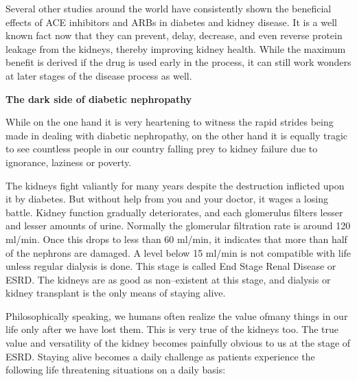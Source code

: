 Several other studies around the world have consistently shown the beneficial effects of ACE inhibitors and ARBs in diabetes and kidney disease. It is a well known fact now that they can prevent, delay, decrease, and even reverse protein leakage from the kidneys, thereby improving kidney health. While the maximum benefit is derived if the drug is used early in the process, it can still work wonders at later stages of the disease process as well.

\noindent\textbf{The dark side of diabetic nephropathy}

While on the one hand it is very heartening to witness the rapid strides being made in dealing with diabetic nephropathy, on the other hand it is equally tragic to see countless people in our country falling prey to kidney failure due to ignorance, laziness or poverty.

The kidneys fight valiantly for many years despite the destruction inflicted upon it by diabetes. But without help from you and your doctor, it wages a losing battle. Kidney function gradually deteriorates, and each glomerulus filters lesser and lesser amounts of urine. Normally the glomerular filtration rate is around 120 ml/min. Once this drops to less than 60 ml/min, it indicates that more than half of the nephrons are damaged. A level below 15 ml/min is not compatible with life unless regular dialysis is done. This stage is called End Stage Renal Disease or ESRD. The kidneys are as good as non–existent at this stage, and dialysis or kidney transplant is the only means of staying alive.

Philosophically speaking, we humans often realize the value of\break many things in our life only after we have lost them. This is very true of the kidneys too. The true value and versatility of the kidney becomes painfully obvious to us at the stage of ESRD. Staying alive becomes a daily challenge as patients experience the following life threatening situations on a daily basis:

